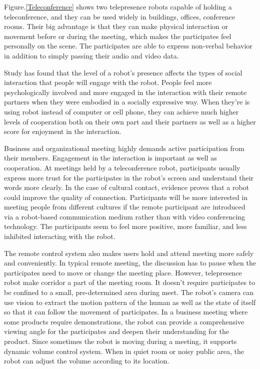 \documentclass[a4paper]{article}
\begin{document}
    Figure.\ref{Teleconference} shows two telepresence robots capable of holding a teleconference, and they can be used widely in buildings, offices, conference rooms\cite{42}. Their big advantage is that they can make physical interaction or movement before or during the meeting, which makes the participates feel personally on the scene. The participates are able to express non-verbal behavior in addition to simply passing their audio and video data\cite{35}.
\par 
    Study has found that the level of a robot's presence affects the types of social interaction that people will engage with the robot\cite{43}. People feel more psychologically involved and more engaged in the interaction with their remote partners when they were embodied in a socially expressive way. When they're is using robot instead of computer or cell phone, they can achieve much higher levels of cooperation both on their own part and their partners as well as a higher score for enjoyment in the interaction. 
\par 
    Business and organizational meeting highly demands active participation from their members. Engagement in the interaction is important as well as cooperation. At meetings held by a teleconference robot, participants usually express more trust for the participates in the robot's screen and understand their words more clearly. In the case of cultural contact, evidence proves that a robot could improve the quality of connection\cite{44}. Participants will be more interested in meeting people from different cultures if the remote participant are introduced via a robot-based communication medium rather than with video conferencing technology. The participants seem to feel more positive, more familiar, and less inhibited interacting with the robot.
\par 
    The remote control system also makes users hold and attend meeting more safely and conveniently. In typical remote meeting, the discussion has to pause when the participates need to move or change the meeting place. However, telepresence robot make corridor a part of the meeting room. It doesn't require participates to be confined to a small, pre-determined area during meet. The robot's camera can use vision to extract the motion pattern of the human as well as the state of itself so that it can follow the movement of participates\cite{45}. In a business meeting where some products require demonstrations, the robot can provide a comprehensive viewing angle for the participates and deepen their understanding for the product. Since sometimes the robot is moving during a meeting, it supports dynamic volume control system. When in quiet room or noisy public area, the robot can adjust the volume according to its location.
\end{document}
